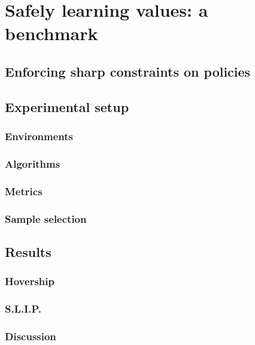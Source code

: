 \chapter{Safely learning values: a benchmark}


\section{Enforcing sharp constraints on policies}

\section{Experimental setup}
\subsection{Environments}
\subsection{Algorithms}
\subsection{Metrics}
\subsection{Sample selection}

\section{Results}
\subsection{Hovership}
\subsection{S.L.I.P.}
\subsection{Discussion}